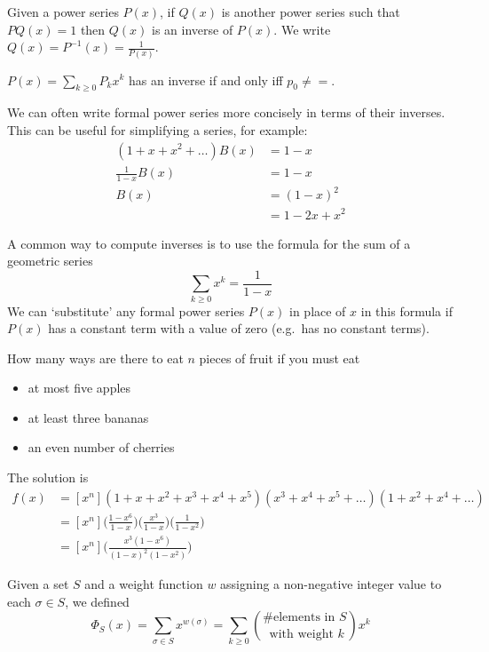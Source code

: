 \documentclass[12pt]{article}
\begin{document}
Given a power series $P(x)$, if $Q(x)$ is another power series such that $PQ(x) = 1$ then $Q(x)$ is an inverse of $P(x)$. We write $Q(x) = P^{-1}(x) = \frac{1}{P(x)}$.

\begin{lemma}
$P(x) = \displaystyle\sum_{k \geq 0} P_k x^k$ has an inverse if and only iff $p_0 \neq =$.
\end{lemma}

We can often write formal power series more concisely in terms of their inverses. This can be useful for simplifying a series, for example:
\begin{align*}
(1 + x + x^2 + \dots) B(x) &= 1-x\\
\frac{1}{1-x} B(x) &= 1 - x\\
B(x) &= {(1-x)}^2\\
&= 1 -2x  + x^2
\end{align*}

A common way to compute inverses is to use the formula for the sum of a geometric series \[ \sum_{k\geq 0} x^k = \frac{1}{1-x} \] We can `substitute' any formal power series $P(x)$ in place of $x$ in this formula if $P(x)$ has a constant term with a value of zero (e.g.\ has no constant terms).

\begin{example}
How many ways are there to eat $n$ pieces of fruit if you must eat
\begin{itemize}
\item at most five apples
\item at least three bananas
\item an even number of cherries
\end{itemize}

The solution is
\begin{align*}
f(x) &= [x^n] (1 + x + x^2 + x^3 + x^4 + x^5)(x^3 + x^4 + x^5 + \dots)(1 + x^2 + x^4 + \dots)\\
&= [x^n] \bigg(\frac{1-x^6}{1-x}\bigg)\bigg(\frac{x^3}{1-x}\bigg)\bigg(\frac{1}{1-x^2}\bigg)\\
&= [x^n] \bigg(\frac{x^3(1-x^6)}{{(1-x)}^2(1-x^2)}\bigg)
\end{align*}
\end{example}

Given a set $S$ and a weight function $w$ assigning a non-negative integer value to each $\sigma \in S$, we defined \[ \Phi_S (x) = \sum_{\sigma\in S} x^{w(\sigma)} = \sum_{k\geq 0} {\text{\# elements in }S \choose \text{ with weight }k} x^k \]
\end{document}
